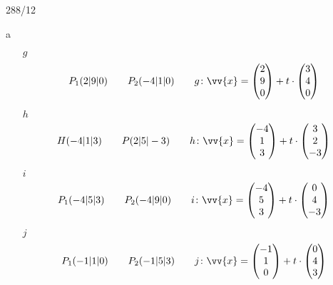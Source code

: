 \begin{exercise}{288/12}
  \item [a]
  \begin{itemize}
    \item [$g$]
    \begin{gather*}
      P_1(2|9|0) \qquad P_2(-4|1|0) \qquad g \colon \vv{x} = \begin{pmatrix}2 \\ 9 \\ 0\end{pmatrix} + t \cdot \begin{pmatrix}3 \\ 4 \\ 0\end{pmatrix}
    \end{gather*}
    \item [$h$]
    \begin{gather*}
      H(-4|1|3) \qquad P(2|5|-3) \qquad h \colon \vv{x} = \begin{pmatrix}-4 \\ 1 \\ 3\end{pmatrix} + t \cdot \begin{pmatrix}3 \\ 2 \\ -3\end{pmatrix}
    \end{gather*}
    \item [$i$]
    \begin{gather*}
      P_1(-4|5|3) \qquad P_2(-4|9|0) \qquad i \colon \vv{x} = \begin{pmatrix}-4 \\ 5 \\ 3\end{pmatrix} + t \cdot \begin{pmatrix}0 \\ 4 \\ -3\end{pmatrix}
    \end{gather*}
    \item [$j$]
    \begin{gather*}
      P_1(-1|1|0) \qquad P_2(-1|5|3) \qquad j \colon \vv{x} = \begin{pmatrix}-1 \\ 1 \\ 0\end{pmatrix} + t \cdot \begin{pmatrix}0 \\ 4 \\ 3\end{pmatrix}

\end{gather*}
\end{itemize}
\end{exercise}

